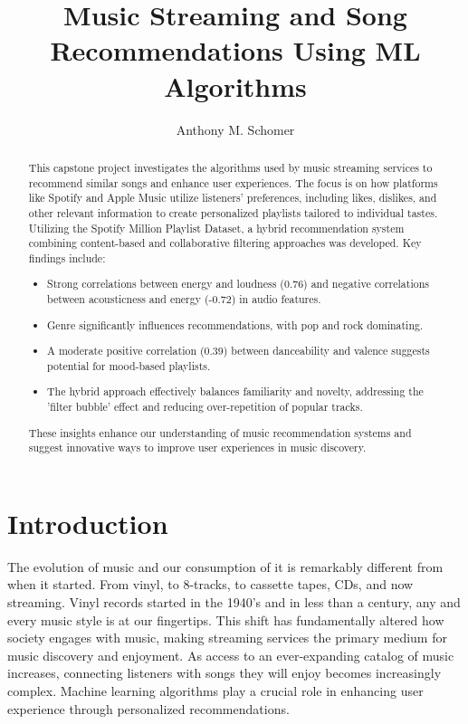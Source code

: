 \documentclass[runningheads]{llncs}
\begin{document}
\title{Music Streaming and Song Recommendations Using ML Algorithms}

\author{Anthony M. Schomer}



\maketitle

\begin{abstract}
This capstone project investigates the algorithms used by music streaming services to recommend similar songs and enhance user experiences. The focus is on how platforms like Spotify and Apple Music utilize listeners’ preferences, including likes, dislikes, and other relevant information to create personalized playlists tailored to individual tastes. Utilizing the Spotify Million Playlist Dataset, a hybrid recommendation system combining content-based and collaborative filtering approaches was developed. Key findings include:
\begin{itemize}
  \item Strong correlations between energy and loudness (0.76) and negative correlations between acousticness and energy (-0.72) in audio features.
  \item Genre significantly influences recommendations, with pop and rock dominating.
  \item A moderate positive correlation (0.39) between danceability and valence suggests potential for mood-based playlists.
  \item The hybrid approach effectively balances familiarity and novelty, addressing the 'filter bubble' effect and reducing over-repetition of popular tracks.
\end{itemize}
These insights enhance our understanding of music recommendation systems and suggest innovative ways to improve user experiences in music discovery.
\end{abstract}

\section{Introduction}

The evolution of music and our consumption of it is remarkably different from when it started. From vinyl, to 8-tracks, to cassette tapes, CDs, and now streaming. Vinyl records started in the 1940's and in less than a century, any and every music style is at our fingertips. This shift has fundamentally altered how society engages with music, making streaming services the primary medium for music discovery and enjoyment. As access to an ever-expanding catalog of music increases, connecting listeners with songs they will enjoy becomes increasingly complex. Machine learning algorithms play a crucial role in enhancing user experience through personalized recommendations.
\end{document}
